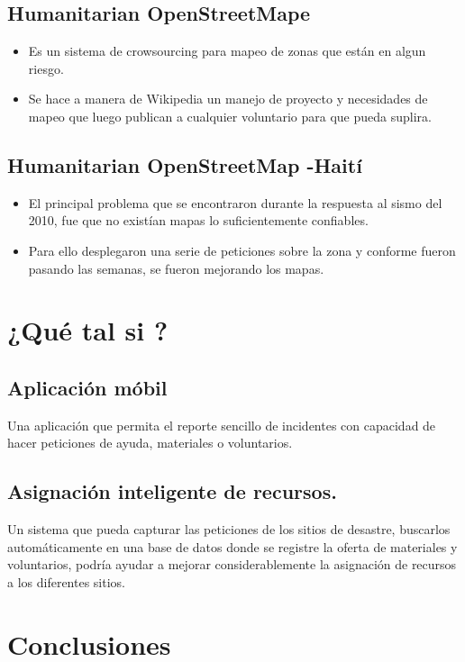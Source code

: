 \documentclass[11pt]{article}
\begin{document}
\subsection{Humanitarian OpenStreetMape}
\label{sec:org0f25ac8}
\begin{itemize}
\item Es un sistema de crowsourcing para mapeo de zonas que están en algun riesgo.
\item Se hace a manera de Wikipedia un manejo de proyecto y necesidades de mapeo que luego publican a cualquier voluntario para que pueda suplira.
\end{itemize}
\subsection{Humanitarian OpenStreetMap -Haití}
\label{sec:orgc0f0fbd}
\begin{itemize}
\item El principal problema que se encontraron durante la respuesta al sismo del 2010, fue que no existían mapas lo suficientemente confiables.
\item Para ello desplegaron una serie de peticiones sobre la zona y conforme fueron pasando las semanas, se fueron mejorando los mapas.
\end{itemize}


\section{¿Qué tal si ?}
\label{sec:orge2dbffa}

\subsection{Aplicación móbil}
\label{sec:org4f8caa6}
Una aplicación que permita el reporte sencillo de incidentes con capacidad de hacer peticiones de ayuda, materiales o voluntarios.
\subsection{Asignación inteligente de recursos.}
\label{sec:org618c3d6}
Un sistema que pueda capturar las peticiones de los sitios de desastre, buscarlos automáticamente en una base de datos donde se registre la oferta de materiales y voluntarios, podría ayudar a mejorar considerablemente la asignación de recursos a los diferentes sitios.

\section{Conclusiones}
\label{sec:org7fbb452}
\end{document}
